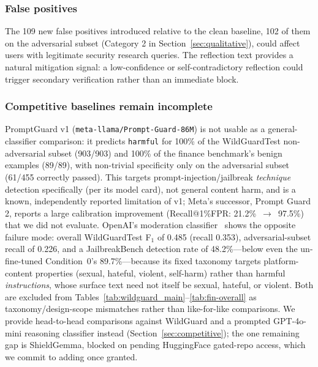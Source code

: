 \documentclass[superintelligence,article,accept,moreauthors]{Definitions/mdpi}
\begin{document}
\subsubsection{False positives}
The 109 new false positives introduced relative to the clean baseline, 102 of them on the adversarial subset (Category 2 in Section~\ref{sec:qualitative}), could affect users with legitimate security research queries. The reflection text provides a natural mitigation signal: a low-confidence or self-contradictory reflection could trigger secondary verification rather than an immediate block.

\subsubsection{Competitive baselines remain incomplete}
PromptGuard v1 (\texttt{meta-llama/Prompt-Guard-86M}) is not usable as a general-classifier comparison: it predicts \texttt{harmful} for 100\% of the WildGuardTest non-adversarial subset (903/903) and 100\% of the finance benchmark's benign examples (89/89), with non-trivial specificity only on the adversarial subset (61/455 correctly passed). This targets prompt-injection/jailbreak \emph{technique} detection specifically (per its model card), not general content harm, and is a known, independently reported limitation of v1; Meta's successor, Prompt Guard 2, reports a large calibration improvement (Recall@1\%FPR: 21.2\%~$\to$~97.5\%) that we did not evaluate. OpenAI's moderation classifier~\citep{markov2023holistic} shows the opposite failure mode: overall WildGuardTest F$_1$ of 0.485 (recall 0.353), adversarial-subset recall of 0.226, and a JailbreakBench detection rate of 48.2\%---below even the un-fine-tuned Condition~0's 89.7\%---because its fixed taxonomy targets platform-content properties (sexual, hateful, violent, self-harm) rather than harmful \emph{instructions}, whose surface text need not itself be sexual, hateful, or violent. Both are excluded from Tables~\ref{tab:wildguard_main}--\ref{tab:fin-overall} as taxonomy/design-scope mismatches rather than like-for-like comparisons. We provide head-to-head comparisons against WildGuard and a prompted GPT-4o-mini reasoning classifier instead (Section~\ref{sec:competitive}); the one remaining gap is ShieldGemma, blocked on pending HuggingFace gated-repo access, which we commit to adding once granted.
\end{document}
